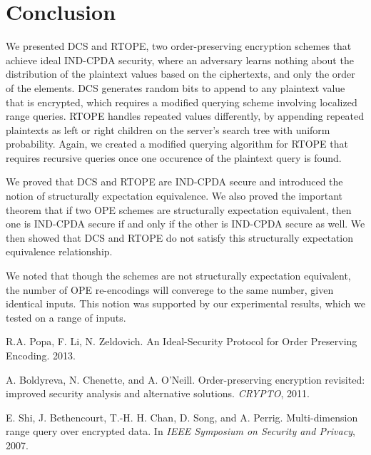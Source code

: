\documentclass[12pt]{article}
\begin{document}
\section{Conclusion}

 We presented DCS and RTOPE, two order-preserving encryption schemes that achieve ideal IND-CPDA security, where an adversary learns nothing about the distribution of the plaintext values based on the ciphertexts, and only the order of the elements. DCS generates random bits to append to any plaintext value that is encrypted, which requires a modified querying scheme involving localized range queries. RTOPE handles repeated values differently, by appending repeated plaintexts as left or right children on the server's search tree with uniform probability. Again, we created a modified querying algorithm for RTOPE that requires recursive queries once one occurence of the plaintext query is found. 

We proved that DCS and RTOPE are IND-CPDA secure and introduced the notion of structurally expectation equivalence. We also proved the important theorem that if two OPE schemes are structurally expectation equivalent, then one is IND-CPDA secure if and only if the other is IND-CPDA secure as well. We then showed that DCS and RTOPE do not satisfy this structurally expectation equivalence relationship.

We noted that though the schemes are not structurally expectation equivalent, the number of OPE re-encodings will converege to the same number, given identical inputs. This notion was supported by our experimental results, which we tested on a range of inputs.
\clearpage

\begin{thebibliography}{9}

  R.A. Popa, F. Li, N. Zeldovich.
  An Ideal-Security Protocol for Order Preserving Encoding.
  2013.

  A. Boldyreva, N. Chenette, and A. O’Neill. 
  Order-preserving encryption revisited: improved security analysis and alternative
  solutions. \emph{CRYPTO}, 2011.
  
  E. Shi, J. Bethencourt, T.-H. H. Chan, D. Song, and A. Perrig.
Multi-dimension range query over encrypted data. In \emph{IEEE
Symposium on Security and Privacy}, 2007.

\end{thebibliography}
  
\end{document}
